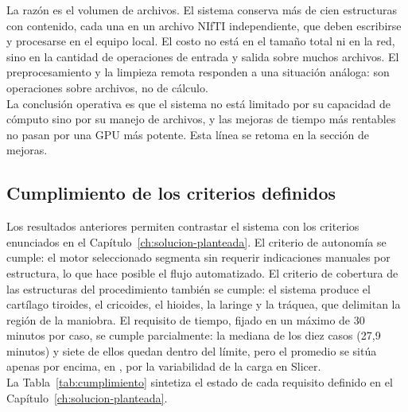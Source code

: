 La razón es el volumen de archivos. El sistema conserva más de cien estructuras con contenido, cada una en un archivo NIfTI independiente, que deben escribirse y procesarse en el equipo local. El costo no está en el tamaño total ni en la red, sino en la cantidad de operaciones de entrada y salida sobre muchos archivos. El preprocesamiento y la limpieza remota responden a una situación análoga: son operaciones sobre archivos, no de cálculo.\\

La conclusión operativa es que el sistema no está limitado por su capacidad de cómputo sino por su manejo de archivos, y las mejoras de tiempo más rentables no pasan por una GPU más potente. Esta línea se retoma en la sección de mejoras.\\

\subsection{Cumplimiento de los criterios definidos}

Los resultados anteriores permiten contrastar el sistema con los criterios enunciados en el Capítulo~\ref{ch:solucion-planteada}. El criterio de autonomía se cumple: el motor seleccionado segmenta sin requerir indicaciones manuales por estructura, lo que hace posible el flujo automatizado. El criterio de cobertura de las estructuras del procedimiento también se cumple: el sistema produce el cartílago tiroides, el cricoides, el hioides, la laringe y la tráquea, que delimitan la región de la maniobra. El requisito de tiempo, fijado en un máximo de 30 minutos por caso, se cumple parcialmente: la mediana de los diez casos (27,9 minutos) y siete de ellos quedan dentro del límite, pero el promedio se sitúa apenas por encima, en \tTotal{}, por la variabilidad de la carga en Slicer.\\

La Tabla~\ref{tab:cumplimiento} sintetiza el estado de cada requisito definido en el Capítulo~\ref{ch:solucion-planteada}.\\

